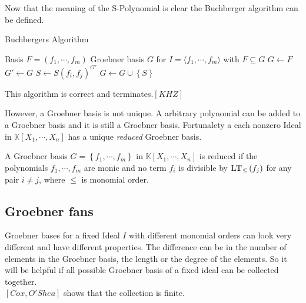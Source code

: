 Now that the meaning of the S-Polynomial is clear the Buchberger algorithm can be defined.

\begin{algorithm}
\caption{Buchbergers Algorithm}\label{buchberger}
\begin{algorithmic}[1]
\Require Basis $F = \left( f_{1}, \cdots, f_{m} \right)  $
\Ensure Groebner basis $G$ for $I = \langle f_{1}, \cdots, f_{m} \rangle $ with $ F \subseteq G $
\State $G \gets F$
\Repeat
\State $G'\gets G $
\State $S \gets S\left( f_{i},f_{j} \right)^{G'}  $ 
\State $G \gets G \cup \left\lbrace S\right\rbrace $
\EndIf
\EndFor
{}

\end{algorithmic}
\end{algorithm}

This algorithm is correct and terminates.$\left[ KHZ\right]  $

\newpage

However, a Groebner basis is not unique. A arbitrary polynomial can be added to a Groebner basis and it is still a Groebner basis.
Fortunalety a each nonzero Ideal in $\mathbb{K}\left[X_{1}, \cdots, X_{n}\right]$ has a unique \textit{reduced} Groebner basis.

\begin{env_definition}
A Groebner basis  $G= \left\lbrace  f_{1}, \cdots , f_{m} \right\rbrace  $ in 
$ \mathbb{K}\left[X_{1}, \cdots, X_{n}\right] $ is reduced if the polynomials $f_{1},\cdots , f_{m} $ are monic and no term $f_{i}$ is divisible by $ \textsc{LT}_{\leq }\left( f_{j}\right)$ for any pair $i\neq j$, where $\leq$ is monomial order.
\end{env_definition}


\subsection{Groebner fans}
 Groebner bases for a fixed Ideal $I$ with different monomial orders can look very different and have different properties. The difference can be in the number of elements in the Groebner basis, the length or the degree of the elements. So it will be helpful if all 
possible Groebner basis of a fixed ideal can be collected together.\\
$\left[ Cox,O'Shea\right]  $ shows that the collection is finite.
 
